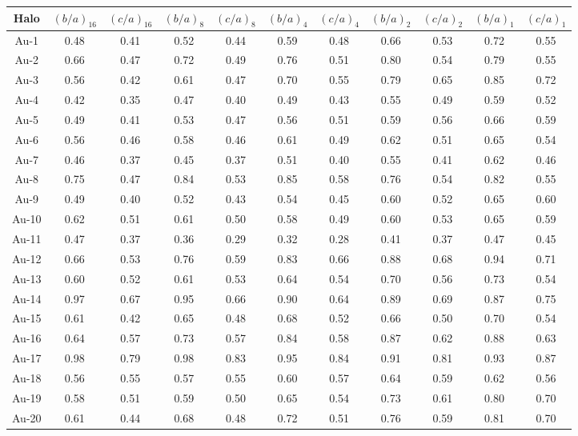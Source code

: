 \documentclass[usenatbib]{mnras}
\begin{document}
\begin{table}
  \centering 
  \begin{tabular}{c c c c c c c c c c c}
  \hline\hline
  Halo & $(b/a)_{16}$ & $(c/a)_{16}$& $(b/a)_{8}$ & $(c/a)_{8}$& $(b/a)_{4}$ & $(c/a)_{4}$& $(b/a)_{2}$ & $(c/a)_{2}$& $(b/a)_{1}$ & $(c/a)_{1}$ \\
  \hline
Au-1 & 0.48 & 0.41 & 0.52 & 0.44 & 0.59 & 0.48 & 0.66 & 0.53 & 0.72 & 0.55\\
Au-2 & 0.66 & 0.47 & 0.72 & 0.49 & 0.76 & 0.51 & 0.80 & 0.54 & 0.79 & 0.55\\
Au-3 & 0.56 & 0.42 & 0.61 & 0.47 & 0.70 & 0.55 & 0.79 & 0.65 & 0.85 & 0.72\\
Au-4 & 0.42 & 0.35 & 0.47 & 0.40 & 0.49 & 0.43 & 0.55 & 0.49 & 0.59 & 0.52\\
Au-5 & 0.49 & 0.41 & 0.53 & 0.47 & 0.56 & 0.51 & 0.59 & 0.56 & 0.66 & 0.59\\
Au-6 & 0.56 & 0.46 & 0.58 & 0.46 & 0.61 & 0.49 & 0.62 & 0.51 & 0.65 & 0.54\\
Au-7 & 0.46 & 0.37 & 0.45 & 0.37 & 0.51 & 0.40 & 0.55 & 0.41 & 0.62 & 0.46\\
Au-8 & 0.75 & 0.47 & 0.84 & 0.53 & 0.85 & 0.58 & 0.76 & 0.54 & 0.82 & 0.55\\
Au-9 & 0.49 & 0.40 & 0.52 & 0.43 & 0.54 & 0.45 & 0.60 & 0.52 & 0.65 & 0.60\\
Au-10 & 0.62 & 0.51 & 0.61 & 0.50 & 0.58 & 0.49 & 0.60 & 0.53 & 0.65 & 0.59\\
Au-11 & 0.47 & 0.37 & 0.36 & 0.29 & 0.32 & 0.28 & 0.41 & 0.37 & 0.47 & 0.45\\
Au-12 & 0.66 & 0.53 & 0.76 & 0.59 & 0.83 & 0.66 & 0.88 & 0.68 & 0.94 & 0.71\\
Au-13 & 0.60 & 0.52 & 0.61 & 0.53 & 0.64 & 0.54 & 0.70 & 0.56 & 0.73 & 0.54\\
Au-14 & 0.97 & 0.67 & 0.95 & 0.66 & 0.90 & 0.64 & 0.89 & 0.69 & 0.87 & 0.75\\
Au-15 & 0.61 & 0.42 & 0.65 & 0.48 & 0.68 & 0.52 & 0.66 & 0.50 & 0.70 & 0.54\\
Au-16 & 0.64 & 0.57 & 0.73 & 0.57 & 0.84 & 0.58 & 0.87 & 0.62 & 0.88 & 0.63\\
Au-17 & 0.98 & 0.79 & 0.98 & 0.83 & 0.95 & 0.84 & 0.91 & 0.81 & 0.93 & 0.87\\
Au-18 & 0.56 & 0.55 & 0.57 & 0.55 & 0.60 & 0.57 & 0.64 & 0.59 & 0.62 & 0.56\\
Au-19 & 0.58 & 0.51 & 0.59 & 0.50 & 0.65 & 0.54 & 0.73 & 0.61 & 0.80 & 0.70\\
Au-20 & 0.61 & 0.44 & 0.68 & 0.48 & 0.72 & 0.51 & 0.76 & 0.59 & 0.81 & 0.70\\

\end{tabular}
\end{table}
\end{document}
